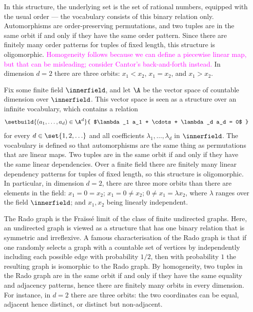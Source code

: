 \begin{example} \label{ex:order-atoms} In this structure, the underlying set is the set of rational numbers, equipped with the usual order --- 
the vocabulary consists of this binary relation only.
Automorphisms are order-preserving permutations, and two tuples are in the same orbit if and only if they have the same order pattern. Since there are finitely many order patterns for tuples of fixed length, this structure is oligomorphic. 
\textcolor{magenta}{Homogeneity follows because we can define a piecewise linear map, but that can be misleading; consider Cantor's back-and-forth instead.}
In dimension $d = 2$ there are three orbits: 
$x_1 < x_2$, $x_1 = x_2$, and $x_1 > x_2$.
\lipicsEnd\end{example}

\begin{example}
     \label{ex:vector-space-atoms} Fix some finite field $\innerfield$, and let $\A$ be the vector space of countable dimension over $\innerfield$. This vector space is seen as a structure over an infinite vocabulary, which contains a relation 
    \begin{align*}
    \setbuild{(a_1,\ldots,a_d) \in \A^d}{ $\lambda_1 a_1 + \cdots + \lambda_d a_d = 0$ }
    \end{align*}
    for every $d \in \set{1,2,\ldots}$ and all coefficients $\lambda_1, \ldots, \lambda_d$ in $\innerfield$. The vocabulary is defined so that automorphisms are the same thing as permutations that are linear maps. Two tuples are in the same orbit if and only if they have the same linear dependencies. Over a finite field there are finitely many linear dependency patterns for tuples of fixed length, so this structure is oligomorphic.
    In particular, in dimension $d = 2$, there are three more orbits than there are elements in the field: 
    $x_1 = 0 = x_2$;
    $x_1 = 0 \neq x_2$;
    $0 \neq x_1 = \lambda x_2$, where $\lambda$ ranges over the field $\innerfield$;
    and $x_1, x_2$ being linearly independent. 
\lipicsEnd\end{example}

\begin{example}\label{ex:rado-graph} The Rado graph is the Fraïssé limit of the class of finite undirected graphs. Here, an undirected graph is viewed as a structure that has one binary relation that is symmetric and irreflexive. 
A famous characterisation of the Rado graph is that if one randomly selects a graph with a countable set of vertices by independently including each possible edge with probability $1/2$, then with probability $1$ the resulting graph is isomorphic to the Rado graph. By homogeneity, two tuples in the Rado graph  are in the same orbit if and only if they have the same equality and adjacency patterns, hence there are finitely many orbits in every dimension.
For instance, in $d = 2$ there are three orbits:
the two coordinates can be equal, adjacent hence distinct, or distinct but non-adjacent.
\lipicsEnd\end{example}
